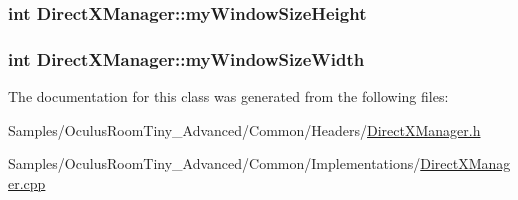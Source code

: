 \subsubsection[{\texorpdfstring{my\+Window\+Size\+Height}{myWindowSizeHeight}}]{\setlength{\rightskip}{0pt plus 5cm}int Direct\+X\+Manager\+::my\+Window\+Size\+Height\hspace{0.3cm}{\ttfamily [protected]}}\hypertarget{class_direct_x_manager_a489f71bd3dcfdaa3e9f6d6c37daee516}{}\label{class_direct_x_manager_a489f71bd3dcfdaa3e9f6d6c37daee516}
\subsubsection[{\texorpdfstring{my\+Window\+Size\+Width}{myWindowSizeWidth}}]{\setlength{\rightskip}{0pt plus 5cm}int Direct\+X\+Manager\+::my\+Window\+Size\+Width\hspace{0.3cm}{\ttfamily [protected]}}\hypertarget{class_direct_x_manager_adc2c37647b0833a08f116c4873f8ab3f}{}\label{class_direct_x_manager_adc2c37647b0833a08f116c4873f8ab3f}


The documentation for this class was generated from the following files\+:\begin{DoxyCompactItemize}
\item 
Samples/\+Oculus\+Room\+Tiny\+\_\+\+Advanced/\+Common/\+Headers/\hyperlink{_direct_x_manager_8h}{Direct\+X\+Manager.\+h}\item 
Samples/\+Oculus\+Room\+Tiny\+\_\+\+Advanced/\+Common/\+Implementations/\hyperlink{_direct_x_manager_8cpp}{Direct\+X\+Manager.\+cpp}\end{DoxyCompactItemize}
